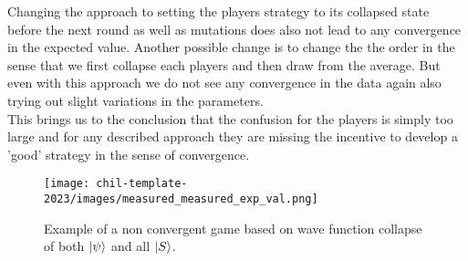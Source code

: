 Changing the approach to setting the players strategy to its collapsed state before the next round as well as mutations does also not lead to any convergence in the expected value. Another possible change is to change the the order in the sense that we first collapse each players and then draw from the average. But even with this approach we do not see any convergence in the data again also trying out slight variations in the parameters.\\

This brings us to the conclusion that the confusion for the players is simply too large and for any described approach they are missing the incentive to develop a 'good' strategy in the sense of convergence.

\begin{figure}[h]
    \centering
    \texttt{[image: chil-template-2023/images/measured\_measured\_exp\_val.png]}
    \caption{Example of a non convergent game based on wave function collapse of both $\ket{\psi}$ and all $\ket{S}$.}
    \label{fig:measured_measured_exp_val}
\end{figure}